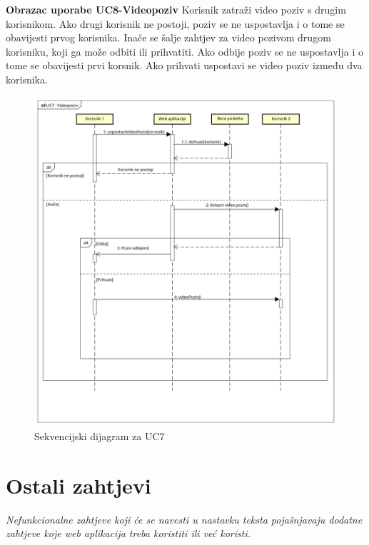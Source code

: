 \eject

\noindent
\textbf{Obrazac uporabe UC8-Videopoziv}\newline
{Korisnik zatraži video poziv s drugim korisnikom. Ako drugi korisnik ne postoji, poziv se ne uspostavlja i o tome se obavijesti prvog korisnika. Inače se šalje zahtjev za video pozivom drugom korisniku, koji ga može odbiti ili prihvatiti. Ako odbije poziv se ne uspostavlja i o tome se obavijesti prvi korsnik. Ako prihvati uspostavi se video poziv između dva korisnika.}


\begin{figure}[H]
	\includegraphics[scale= 0.5]{slike/sekvencijski_dijagramUC7.png}
	\centering
	\caption{Sekvencijski dijagram za UC7}
	\label{fig:Sekvencijski dijagram za UC7}
\end{figure}

\eject

\section{Ostali zahtjevi}

\textit{Nefunkcionalne zahtjeve koji će se navesti u nastavku teksta pojašnjavaju dodatne zahtjeve koje web aplikacija treba koristiti ili već koristi.}

